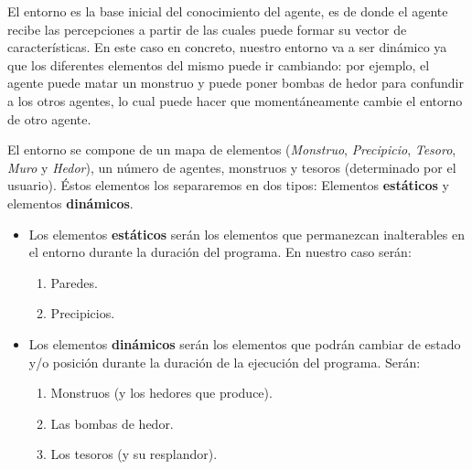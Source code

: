 El entorno es la base inicial del conocimiento del agente, es de donde el agente recibe las percepciones a partir de las cuales puede formar su vector de características. En este caso en concreto, nuestro entorno va a ser dinámico ya que los diferentes elementos del mismo puede ir cambiando: por ejemplo, el agente puede matar un monstruo y puede poner bombas de hedor para confundir a los otros agentes, lo cual puede hacer que momentáneamente cambie el entorno de otro agente.

El entorno se compone de un mapa de elementos (\emph{Monstruo}, \emph{Precipicio}, \emph{Tesoro}, \emph{Muro} y \emph{Hedor}), un número de agentes, monstruos y tesoros (determinado por el usuario). Éstos elementos los separaremos en dos tipos: Elementos \textbf{estáticos} y elementos \textbf{dinámicos}.
\begin{itemize}
    \item Los elementos \textbf{estáticos} serán los elementos que permanezcan inalterables en el entorno durante la duración del programa. En nuestro caso serán:
    \begin{enumerate}
        \item Paredes.
        \item Precipicios.
    \end{enumerate}
    \item Los elementos \textbf{dinámicos} serán los elementos que podrán cambiar de estado y/o posición durante la duración de la ejecución del programa. Serán:
    \begin{enumerate}
        \item Monstruos (y los hedores que produce).
        \item Las bombas de hedor.
        \item Los tesoros (y su resplandor).
    \end{enumerate}{}
\end{itemize}{}

